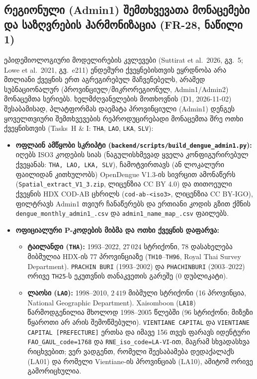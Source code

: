 \documentclass[11pt,a4paper]{article}
\begin{document}
\subsection{რეგიონული (Admin1) შემთხვევათა მონაცემები და საზღვრების ჰარმონიზაცია (FR-28, ნაწილი 1)}
ეპიდემიოლოგიური მოდელირების კვლევები (Suttirat et al.\ 2026, გვ.~5; Lowe et al.\ 2021, გვ.~e211)
ენდემური ქვეყნებისთვის ეყრდნობა არა მთლიანი ქვეყნის ერთ აგრეგირებულ მაჩვენებელს, არამედ სუბნაციონალურ
(პროვინციულ/მიკრორეგიონულ, Admin1/Admin2) მონაცემთა სერიებს. ხელმძღვანელების მოთხოვნის (D1, 2026-11-02)
შესაბამისად, პლატფორმას დაემატა პროვინციული (Admin1) დენგეს ყოველთვიური შემთხვევების
რეპროდუცირებადი მონაცემთა შრე ოთხი ქვეყნისთვის (Tasks~H \& I: \texttt{THA}, \texttt{LAO}, \texttt{LKA}, \texttt{SLV}):
\begin{itemize}[leftmargin=1.4em]
  \item \textbf{ოფლაინ ამწყობი სკრიპტი (\texttt{backend/scripts/build\_dengue\_admin1.py}):}
    იღებს ISO3 კოდების სიას (ნაგულისხმევად ყველა კონფიგურირებულ ქვეყანას: \texttt{THA, LAO, LKA, SLV}),
    ჩამოტვირთავს (ან ლოკალური ფაილიდან კითხულობს) OpenDengue V1.3-ის სივრცით ამონაწერს
    (\texttt{Spatial\_extract\_V1\_3.zip}, ლიცენზია CC BY 4.0) და თითოეული ქვეყნის HDX COD-AB
    ცხრილს (\texttt{cod-ab-<iso3>}, ლიცენზია CC BY-IGO), ფილტრავს Admin1 თვიურ ჩანაწერებს და
    ერთიანი კოდის გზით ქმნის \texttt{dengue\_monthly\_admin1\_<ISO3>.csv} და
    \texttt{admin1\_name\_map\_<ISO3>.csv} ფაილებს.
  \item \textbf{ოფიციალური P-კოდების მიბმა და ოთხი ქვეყნის დაფარვა:}
    \begin{itemize}
      \item \textbf{ტაილანდი (\texttt{THA}):} 1993--2022, $27\,024$ სტრიქონი, 78 დასახელება მიბმულია HDX-ის 77 პროვინციაზე (\texttt{TH10}--\texttt{TH96}, Royal Thai Survey Department). \texttt{PRACHIN BURI} (1993--2002) და \texttt{PHACHINBURI} (2003--2022) ორივე \texttt{TH25}-ს ეკუთვნის თანაკვეთის გარეშე ($0$ დუბლიკატი).
      \item \textbf{ლაოსი (\texttt{LAO}):} 1998--2010, $2\,419$ მიბმული სტრიქონი (16 პროვინცია, National Geographic Department). Xaisomboon (\texttt{LA18}) წარმოდგენილია მხოლოდ 1998--2005 წლებში (96 სტრიქონი; მიზეზი წყაროთი არ არის შემოწმებული). \texttt{VIENTIANE CAPITAL} და \texttt{VIENTIANE CAPITAL [PREFECTURE]} ერთსა და იმავე 156 თვეს ფარავს იდენტური \texttt{FAO\_GAUL\_code=1768} და \texttt{RNE\_iso\_code=LA-VI}-ით, მაგრამ სხვადასხვა რიცხვებით; ვერ ვადგენთ, რომელი შეესაბამება დედაქალაქს (LA01) და რომელი Vientiane-ის პროვინციას (LA10), ამიტომ ორივე გამორიცხულია.

\end{itemize}
\end{itemize}
\end{document}
